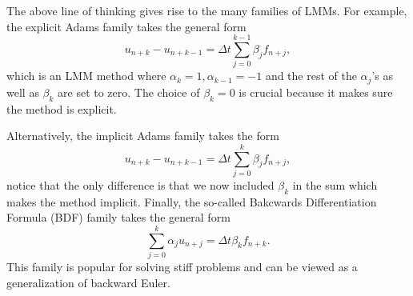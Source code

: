 The above line of thinking gives rise to the many families of LMMs. 
For example, the explicit Adams family takes the general form 
\begin{equation*}
    u_{n+k} - u_{n+k - 1} = \Delta t\sum_{j=0}^{k-1} \beta_j f_{n + j},
\end{equation*}
which is an LMM method where $\alpha_k =1, \alpha_{k-1} = -1$ and 
the rest of the $\alpha_j$'s as well as $\beta_k$ are set to zero. 
The choice of $\beta_k = 0$ is crucial because it makes sure 
the method is explicit. 

Alternatively, the implicit Adams family takes the form 
\begin{equation*}
    u_{n+k} - u_{n+k - 1} = \Delta t\sum_{j=0}^{k} \beta_j f_{n + j},
\end{equation*}
notice that the only difference is that we now included 
$\beta_k$ in the sum which makes the method implicit. Finally, 
the so-called Bakcwards Differentiation Formula (BDF) family takes 
the general form 
\begin{equation*}
    \sum_{j=0}^k \alpha_j u_{n+j} = \Delta t \beta_k f_{n+k}.
\end{equation*} 
This family is popular for solving stiff problems and can be viewed as a 
generalization of backward Euler.




